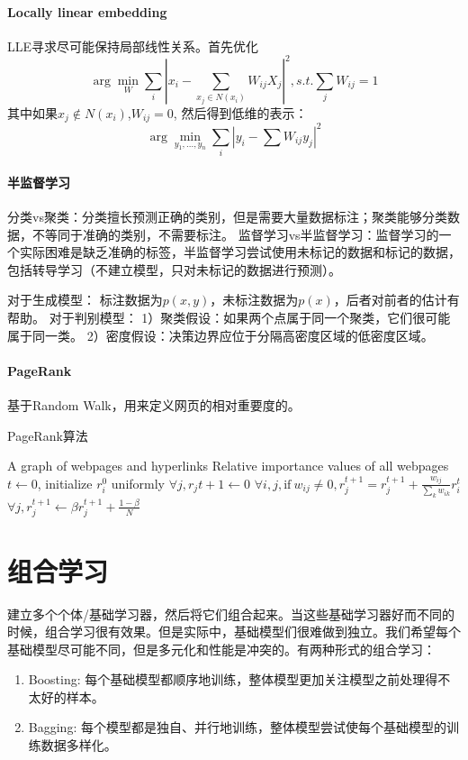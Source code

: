 \paragraph{Locally linear embedding} 
LLE寻求尽可能保持局部线性关系。首先优化
\begin{equation}
\arg \min_W \sum_i |x_i-\sum_{x_j \in N(x_i)} W_{ij}X_j|^2, s.t. \sum_j W_{ij} = 1
\end{equation}
其中如果$x_j \notin N(x_i)$,$W_{ij}=0$, 然后得到低维的表示：
\begin{equation}
\arg \min_{y_1,...,y_n} \sum_i |y_i - \sum W_{ij}y_j|^2
\end{equation}

\paragraph{半监督学习} 分类vs聚类：分类擅长预测正确的类别，但是需要大量数据标注；聚类能够分类数据，不等同于准确的类别，不需要标注。
监督学习vs半监督学习：监督学习的一个实际困难是缺乏准确的标签，半监督学习尝试使用未标记的数据和标记的数据，包括转导学习（不建立模型，只对未标记的数据进行预测）。

对于生成模型：
标注数据为$p(x,y)$，未标注数据为$p(x)$，后者对前者的估计有帮助。
对于判别模型：
1）聚类假设：如果两个点属于同一个聚类，它们很可能属于同一类。
2）密度假设：决策边界应位于分隔高密度区域的低密度区域。

\paragraph{PageRank} 基于Random Walk，用来定义网页的相对重要度的。
\begin{algorithm}[H]
\caption{PageRank算法}
\label{alg:PageRank}
\begin{algorithmic}[1]
\Require A graph of webpages and hyperlinks
\Ensure Relative importance values of all webpages
\State $t \leftarrow 0$, initialize $r_i^0$ uniformly
\Repeat
\State $\forall j, r_j{t+1} \leftarrow 0$
\State $\forall i,j, \mathrm{if}\ w_{ij} \neq 0, r_j^{t+1} = r_j^{t+1} + \frac{w_{ij}}{\sum_k w_{ik}}r_i^t$
\State $\forall j, r_j^{t+1} \leftarrow \beta r_j^{t+1} + \frac{1-\beta}{N}$
\end{algorithmic}
\end{algorithm}

\section{组合学习}
建立多个个体/基础学习器，然后将它们组合起来。当这些基础学习器好而不同的时候，组合学习很有效果。但是实际中，基础模型们很难做到独立。我们希望每个基础模型尽可能不同，但是多元化和性能是冲突的。有两种形式的组合学习：
\begin{enumerate}
    \item Boosting: 每个基础模型都顺序地训练，整体模型更加关注模型之前处理得不太好的样本。
    \item Bagging: 每个模型都是独自、并行地训练，整体模型尝试使每个基础模型的训练数据多样化。
\end{enumerate}

